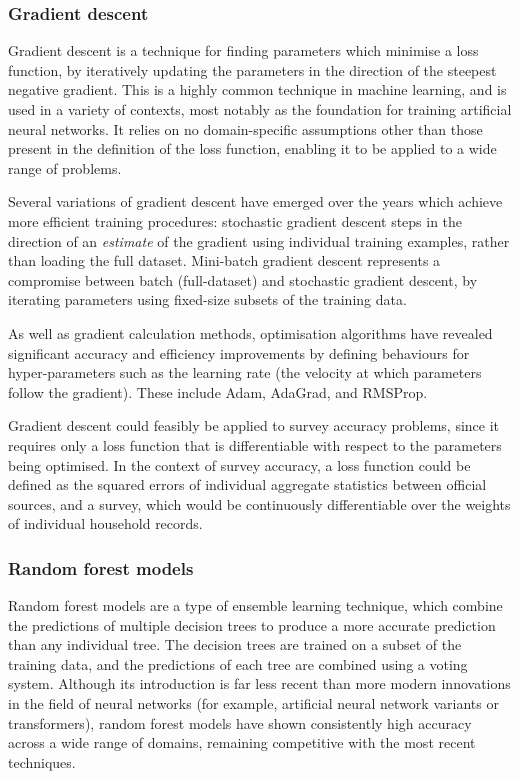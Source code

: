 \documentclass[10pt,journal,compsoc]{IEEEtran}
\begin{document}
\subsubsection{Gradient descent}

Gradient descent is a technique for finding parameters which minimise a loss function, by iteratively updating the parameters in the direction of the steepest negative gradient\cite{gradient_descent}. This is a highly common technique in machine learning, and is used in a variety of contexts, most notably as the foundation for training artificial neural networks. It relies on no domain-specific assumptions other than those present in the definition of the loss function, enabling it to be applied to a wide range of problems.

Several variations of gradient descent have emerged over the years which achieve more efficient training procedures: stochastic gradient descent steps in the direction of an \emph{estimate} of the gradient using individual training examples, rather than loading the full dataset\cite{sgd}. Mini-batch gradient descent represents a compromise between batch (full-dataset) and stochastic gradient descent, by iterating parameters using fixed-size subsets of the training data\cite{mini_batch}.

As well as gradient calculation methods, optimisation algorithms have revealed significant accuracy and efficiency improvements by defining behaviours for hyper-parameters such as the learning rate (the velocity at which parameters follow the gradient). These include Adam\cite{adam}, AdaGrad\cite{adagrad}, and RMSProp.

Gradient descent could feasibly be applied to survey accuracy problems, since it requires only a loss function that is differentiable with respect to the parameters being optimised. In the context of survey accuracy, a loss function could be defined as the squared errors of individual aggregate statistics between official sources, and a survey, which would be continuously differentiable over the weights of individual household records.

\subsubsection{Random forest models}

Random forest models are a type of ensemble learning technique, which combine the predictions of multiple decision trees to produce a more accurate prediction than any individual tree\cite{random_forests}. The decision trees are trained on a subset of the training data, and the predictions of each tree are combined using a voting system. Although its introduction is far less recent than more modern innovations in the field of neural networks (for example, artificial neural network variants\cite{anns} or transformers\cite{transformers}), random forest models have shown consistently high accuracy across a wide range of domains, remaining competitive with the most recent techniques.
\end{document}
